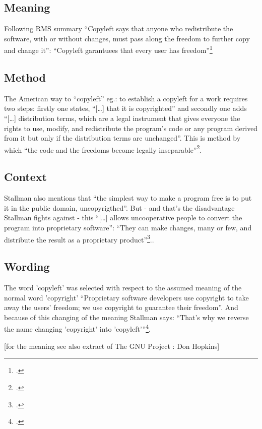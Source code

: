 \documentclass[DIV=calc,BCOR=5mm,11pt,headings=small,oneside,abstract=true, toc=bib]{scrartcl}
\begin{document}
\subsection{Meaning}

Following RMS summary \enquote{Copyleft says that anyone who redistribute the
software, with or without changes, must pass along the freedom to further copy
and change it}: \enquote{Copyleft garantuees that every user has
freedom}\footcite[cf][89]{Stallman1996c}

\subsection{Method}

The American way to \enquote{copyleft} eg.: to establish a copyleft for a
work requires two steps: firstly one states, \enquote{[\ldots] that it is
copyrighted} and secondly one adds \enquote{[\ldots] distribution
terms, which are a legal instrument that gives everyone the rights to use,
modify, and redistribute the program's code or any program derived from it
but only if the distribution terms are unchanged}. This is method by which 
\enquote{the code and the freedoms become legally
inseparable}\footcite[cf][89]{Stallman1996c}.

\subsection{Context}
Stallman also mentions that \enquote{the simplest way to make a program
free is to put it in the public domain, uncopyrigthed}. But - and that's
the disadvantage Stallman fights against - this \enquote{[\ldots] allows
uncooperative people to convert the program into proprietary software}:
\enquote{They can make changes, many or few, and distribute the result as a
proprietary product}\footcite[cf][89]{Stallman1996c}..


\subsection{Wording}

The word 'copyleft' was selected with respect to the assumed meaning of
the normal word 'copyright' \enquote{Proprietary software developers use
copyright to take away the users' freedom; we use copyright to guarantee
their freedom}. And because of this changing of the meaning Stallman says:
\enquote{That's why we reverse the name changing 'copyright' into
'copyleft'}\footcite[cf][89]{Stallman1996c}.

[for the meaning see also extract of The GNU Project : Don Hopkins]

\small

\end{document}
